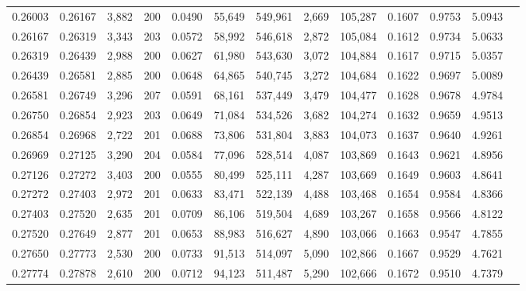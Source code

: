 \begin{tabular}{rrrrrrrrrrrrr}
0.26003 & 0.26167 & 3,882 & 200 &                                     0.0490 &  55,649 & 549,961 &   2,669 & 105,287 & 0.1607 & 0.9753 & 5.0943 \\
0.26167 & 0.26319 & 3,343 & 203 &                                     0.0572 &  58,992 & 546,618 &   2,872 & 105,084 & 0.1612 & 0.9734 & 5.0633 \\
0.26319 & 0.26439 & 2,988 & 200 &                                     0.0627 &  61,980 & 543,630 &   3,072 & 104,884 & 0.1617 & 0.9715 & 5.0357 \\
0.26439 & 0.26581 & 2,885 & 200 &                                     0.0648 &  64,865 & 540,745 &   3,272 & 104,684 & 0.1622 & 0.9697 & 5.0089 \\
0.26581 & 0.26749 & 3,296 & 207 &                                     0.0591 &  68,161 & 537,449 &   3,479 & 104,477 & 0.1628 & 0.9678 & 4.9784 \\
0.26750 & 0.26854 & 2,923 & 203 &                                     0.0649 &  71,084 & 534,526 &   3,682 & 104,274 & 0.1632 & 0.9659 & 4.9513 \\
0.26854 & 0.26968 & 2,722 & 201 &                                     0.0688 &  73,806 & 531,804 &   3,883 & 104,073 & 0.1637 & 0.9640 & 4.9261 \\
0.26969 & 0.27125 & 3,290 & 204 &                                     0.0584 &  77,096 & 528,514 &   4,087 & 103,869 & 0.1643 & 0.9621 & 4.8956 \\
0.27126 & 0.27272 & 3,403 & 200 &                                     0.0555 &  80,499 & 525,111 &   4,287 & 103,669 & 0.1649 & 0.9603 & 4.8641 \\
0.27272 & 0.27403 & 2,972 & 201 &                                     0.0633 &  83,471 & 522,139 &   4,488 & 103,468 & 0.1654 & 0.9584 & 4.8366 \\
0.27403 & 0.27520 & 2,635 & 201 &                                     0.0709 &  86,106 & 519,504 &   4,689 & 103,267 & 0.1658 & 0.9566 & 4.8122 \\
0.27520 & 0.27649 & 2,877 & 201 &                                     0.0653 &  88,983 & 516,627 &   4,890 & 103,066 & 0.1663 & 0.9547 & 4.7855 \\
0.27650 & 0.27773 & 2,530 & 200 &                                     0.0733 &  91,513 & 514,097 &   5,090 & 102,866 & 0.1667 & 0.9529 & 4.7621 \\
0.27774 & 0.27878 & 2,610 & 200 &                                     0.0712 &  94,123 & 511,487 &   5,290 & 102,666 & 0.1672 & 0.9510 & 4.7379 \\

\end{tabular}
